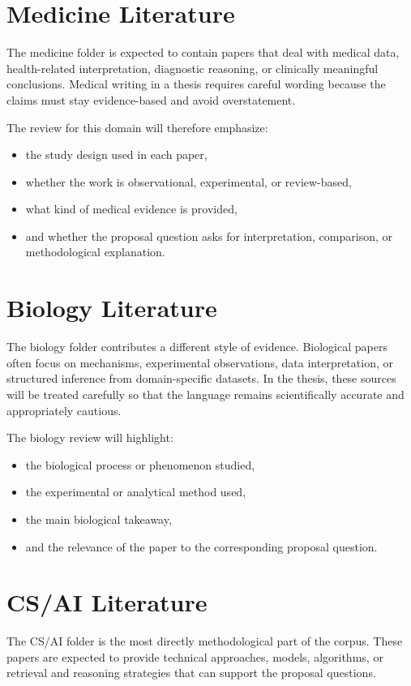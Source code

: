 \documentclass[12pt,a4paper,oneside]{book}
\begin{document}
\section{Medicine Literature}
The medicine folder is expected to contain papers that deal with medical data, health-related interpretation, diagnostic reasoning, or clinically meaningful conclusions. Medical writing in a thesis requires careful wording because the claims must stay evidence-based and avoid overstatement.

The review for this domain will therefore emphasize:
\begin{itemize}[leftmargin=*]
  \item the study design used in each paper,
  \item whether the work is observational, experimental, or review-based,
  \item what kind of medical evidence is provided,
  \item and whether the proposal question asks for interpretation, comparison, or methodological explanation.
\end{itemize}

\section{Biology Literature}
The biology folder contributes a different style of evidence. Biological papers often focus on mechanisms, experimental observations, data interpretation, or structured inference from domain-specific datasets. In the thesis, these sources will be treated carefully so that the language remains scientifically accurate and appropriately cautious.

The biology review will highlight:
\begin{itemize}[leftmargin=*]
  \item the biological process or phenomenon studied,
  \item the experimental or analytical method used,
  \item the main biological takeaway,
  \item and the relevance of the paper to the corresponding proposal question.
\end{itemize}

\section{CS/AI Literature}
The CS/AI folder is the most directly methodological part of the corpus. These papers are expected to provide technical approaches, models, algorithms, or retrieval and reasoning strategies that can support the proposal questions.
\end{document}
